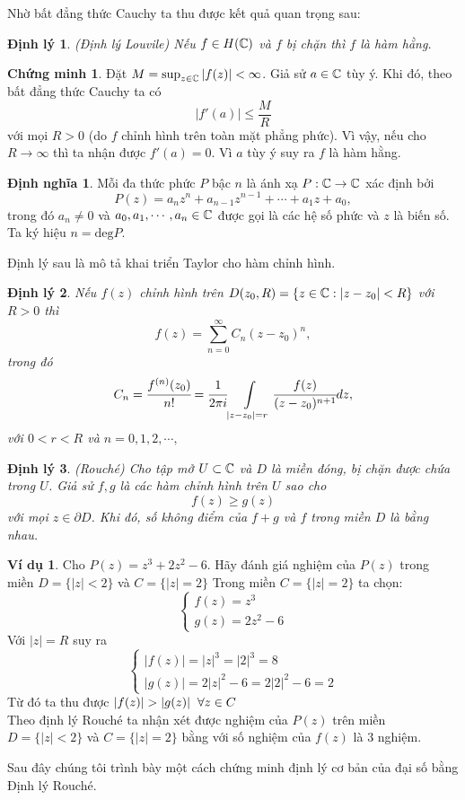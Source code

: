 \documentclass[a5paper,12pt]{report}
\theoremstyle{definition}
\newtheorem{dinhngia}{Định nghĩa}[section]
\newtheorem{vidu}{Ví dụ}[section]
\newtheorem*{chungminh}{Chứng minh}
\newtheorem{dinhly}{Định lý}[section]
\newcommand{\dn}{\begin{dinhngia}}
\newcommand{\hdn}{\end{dinhngia}}
\newcommand{\vd}{\begin{vidu}}
\newcommand{\hvd}{\end{vidu}}
\newcommand{\cm}{\begin{chungminh}}
\newcommand{\hcm}{\end{chungminh}}
\newcommand{\dl}{\begin{dinhly}\itshape}
\newcommand{\hdl}{\end{dinhly}}
\def\leq{\leqslant}
\def\geq{\geqslant}
\numberwithin{equation}{chapter}
\def\vt{\vert}
\def\vt{\vert}
\def\deg{\text{deg}}
\def\vt{\vert}
\def\C{\Bbb C}
\begin{document}
	Nhờ bất đẳng thức Cauchy ta thu được kết quả quan trọng sau:
	\dl{\rm (Định lý Louvile)} Nếu $f\in H(\C)$ và $f$ bị chặn thì $f$ là hàm hằng.
	\hdl
	\cm Đặt $M=\sup_{z\in\C} \vt f(z)\vt<\infty$. Giả sử $a\in \Bbb C$ tùy ý. Khi đó, theo bất đẳng thức Cauchy ta có
	$$\vt f'(a)\vt \leq \frac{M}{R}$$
	với mọi $R>0$ (do $f$ chỉnh hình trên toàn mặt phẳng phức).   Vì vậy, nếu cho $R\to \infty$ thì ta nhận được $f'(a)=0$. Vì $a$ tùy ý suy ra $f$ là hàm hằng.
	\hcm
	
	\dn Mỗi đa thức phức $P$ bậc $n$ là ánh xạ $P: \Bbb C\to \Bbb C$ xác định bởi
	$$P(z)=a_n z^n+a_{n-1} z^{n-1}+\cdots+a_1z+a_0,$$
	trong đó $a_n\ne 0$ và $a_0,a_1,\cdots,a_n\in \Bbb C$ được gọi là các hệ số phức và $z$ là biến số. Ta ký hiệu $n=\deg P$.
	\hdn
	Định lý sau là mô tả khai triển Taylor cho hàm chỉnh hình.
	\dl\label{Taylor} Nếu $f(z)$ chỉnh hình trên $D(z_0,R)=\{z\in \Bbb C: \vert z-z_0\vert<R\}$ với $R>0$ thì
	$$f(z)=\sum_{n=0}^\infty C_n(z-z_0)^n,$$
	trong đó
	\begin{equation}\label{lt3}
		C_n=\cfrac{f^{(n)}(z_0)}{n!}=\cfrac{1}{2\pi i}\int\limits_{\vt z-z_0\vt =r}\cfrac{f(z)}{(z-z_0)^{n+1}}dz,
	\end{equation}
	với $0<r<R$ và $n=0,1,2,\cdots,$
	\hdl
	
	\dl (Rouché) Cho tập mở $U\subset \Bbb C$ và $D$ là miền đóng, bị chặn được chứa trong $U$. Giả sử $f,g$ là các hàm chỉnh hình trên $U$ sao cho
	\begin{equation}\label{rouche1}
		f(z)\geq g(z)
	\end{equation}
	với mọi $z\in \partial D$. Khi đó, số không điểm của $f+g$ và $f$ trong miền $D$ là bằng nhau.
	\hdl
	\vd Cho $P(z)=z^3+2z^2-6$. Hãy đánh giá nghiệm của $P(z)$ trong miền $D=\{|z|<2\}$ và $C=\{|z|=2\}$
	Trong miền $C=\{|z|=2\}$ ta chọn:
	$$
	\begin{cases}
		f(z)=z^3\\
		g(z)=2z^2-6
	\end{cases}$$
	Với $|z|=R$ suy ra
	$$
	\begin{cases}
		|f(z)|=|z|^3=|2|^3=8 \\
		|g(z)|=2|z|^2-6=2|2|^2-6=2
	\end{cases}$$
	Từ đó ta thu được $|f(z)|>|g(z)| \hspace{0.2cm} \forall z \in C$\\
	Theo định lý Rouché ta nhận xét được nghiệm của $P(z)$ trên miền $D=\{|z|<2\}$ và $C=\{|z|=2\}$ bằng với số nghiệm của $f(z)$ là 3 nghiệm.\\
	\hvd
	Sau đây chúng tôi trình bày một cách chứng minh định lý cơ bản của đại số bằng Định lý Rouché.
	
\end{document}
